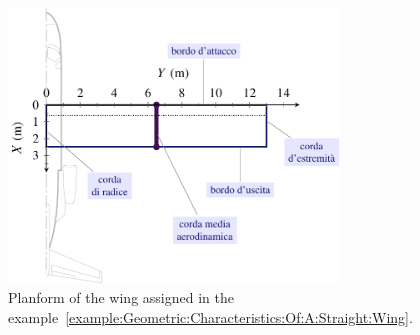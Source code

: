\documentclass[[12pt,twoside]{book}
\begin{document}
\begin{figure}[t]%
  \centering
    \includegraphics[width=0.78\textwidth]{Chapter_2/geometric_characteristics_of_a_straight_wing/wing_planform_basic_0_drawing.pdf}%
  \caption{
          Planform of the wing assigned in the example~\ref{example:Geometric:Characteristics:Of:A:Straight:Wing}.}
  \label{fig:Wing:Planform:Basic:Drawing:AA}%
\end{figure}
%
%

%
\end{document}
